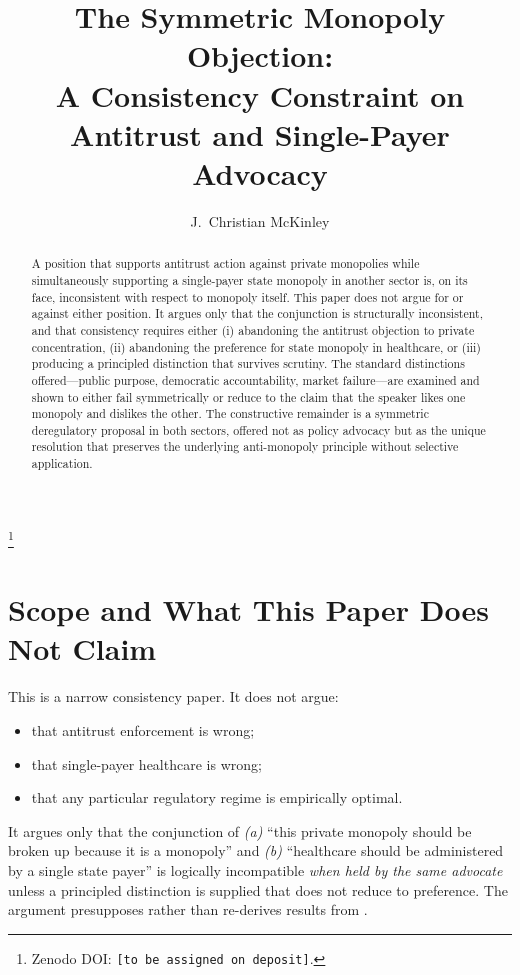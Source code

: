 \documentclass[11pt]{article}
\title{The Symmetric Monopoly Objection:\\
A Consistency Constraint on Antitrust and Single-Payer Advocacy}
\author{J.~Christian McKinley}
\date{}
\newcommand{\blfootnote}[1]{%
  \begingroup
  \renewcommand\thefootnote{}\footnote{#1}%
  \addtocounter{footnote}{-1}%
  \endgroup
}
\begin{document}
\maketitle
\blfootnote{Zenodo DOI: \texttt{[to be assigned on deposit]}.}

\begin{abstract}
A position that supports antitrust action against private monopolies while simultaneously supporting a single-payer state monopoly in another sector is, on its face, inconsistent with respect to monopoly itself. This paper does not argue for or against either position. It argues only that the conjunction is structurally inconsistent, and that consistency requires either (i) abandoning the antitrust objection to private concentration, (ii) abandoning the preference for state monopoly in healthcare, or (iii) producing a principled distinction that survives scrutiny. The standard distinctions offered---public purpose, democratic accountability, market failure---are examined and shown to either fail symmetrically or reduce to the claim that the speaker likes one monopoly and dislikes the other. The constructive remainder is a symmetric deregulatory proposal in both sectors, offered not as policy advocacy but as the unique resolution that preserves the underlying anti-monopoly principle without selective application.
\end{abstract}

\section{Scope and What This Paper Does Not Claim}

This is a narrow consistency paper. It does not argue:
\begin{itemize}[leftmargin=*]
  \item that antitrust enforcement is wrong;
  \item that single-payer healthcare is wrong;
  \item that any particular regulatory regime is empirically optimal.
\end{itemize}
It argues only that the conjunction of \emph{(a)} ``this private monopoly should be broken up because it is a monopoly'' and \emph{(b)} ``healthcare should be administered by a single state payer'' is logically incompatible \emph{when held by the same advocate} unless a principled distinction is supplied that does not reduce to preference. The argument presupposes rather than re-derives results from \cite{mckinley0A,mckinley0B,mckinley4,mckinley5}.
\end{document}
